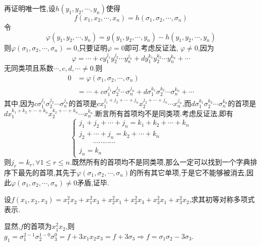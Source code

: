 \begin{formal}
\begin{Proof}
    再证明唯一性,设$h\left(
        y_1,y_2,\cdots,y_n
    \right)$使得
    \[
    f\left(
        x_1,x_2,\cdots,x_n
    \right)=h\left(
        \sigma_1,\sigma_2,\cdots,\sigma_n
    \right)
    \]令
    \[
    \varphi\left(
        y_1,y_2,\cdots,y_n  
    \right)=g\left(
        y_1,y_2,\cdots,y_n
    \right)-h\left(
        y_1,y_2,\cdots,y_n
    \right)
    \]则$
    \varphi\left(
        \sigma_1,\sigma_2,\cdots,\sigma_n   
    \right)=0
    $,只要证明$\varphi=0$即可.考虑反证法, $\varphi\neq 0$,因为
    \[
    \varphi =
    \cdots+c y_1^{j_1}y_2^{j_2}\cdots y_n^{j_n}+d y_1^{k_1}y_2^{k_2}\cdots y_n^{k_n}+\cdots
    \]
    无同类项且系数$\cdots,c,d,\cdots\neq 0$.则
    \begin{align*}
        0&=\varphi\left(
            \sigma_1,\sigma_2,\cdots,\sigma_n
        \right)\\
        &=\cdots+c\sigma_1^{j_1}\sigma_2^{j_2}\cdots\sigma_n^{j_n}+d\sigma_1^{k_1}\sigma_2^{k_2}\cdots\sigma_n^{k_n}+\cdots
    \end{align*}
    其中,因为$c\sigma_1^{j_1}
    \sigma_2^{j_2}\cdots\sigma_n^{j_n}
    $的首项是$
    cx_1^{j_1+j_2+\cdots+j_n}x_2^{j_2+\cdots+j_n}\cdots x_n^{j_n}
    $,而$d\sigma_1^{k_1}\sigma_2^{k_2}\cdots\sigma_n^{k_n}$的首项是$
    dx_1^{k_1+k_2+\cdots+k_n}x_2^{k_2+\cdots+k_n}\cdots x_n^{k_n}
    $.断言所有首项均不是同类项.考虑反证法,即有
    \[
    \begin{cases*}
        j_1+j_2+\cdots+j_n=k_1+k_2+\cdots+k_n\\
        j_2+\cdots+j_n=k_2+\cdots+k_n\\
        \qquad\cdots\cdots\cdots\cdots\\
        j_n=k_n
    \end{cases*}
    \]则$j_r=k_r,\forall 1\leqslant r\leqslant n$.既然所有的首项均不是同类项,那么一定可以找到一个字典排序下最先的首项,其先于$\varphi
    \left(
        \sigma_1,\sigma_2,\cdots,\sigma_n
    \right)$的所有其它单项,于是它不能够被消去,因此$
    \varphi\left(
        \sigma_1,\sigma_2,\cdots,\sigma_n
    \right)\neq 0
    $矛盾,证毕.
\end{Proof}
\end{formal}
\begin{brown}
\begin{example}
    设$f\left(x_1,x_2,x_3\right)=x_1^2x_2
    +x_1^2x_3
    +x_2^2x_1+x_2^2x_3+x_3^2x_1+x_3^2x_2$,求其初等对称多项式表示.
\end{example}
\begin{solution}
    显然,$f$的首项为$x_1^2x_2$,则$g_1=
    \sigma_1^{2-1}\sigma_2^{1-0}\sigma_3^{0}=f+3x_1x_2x_3=f+3\sigma_3
    \Longrightarrow f=\sigma_1\sigma_2-3\sigma_3.$
\end{solution}
\end{brown}
